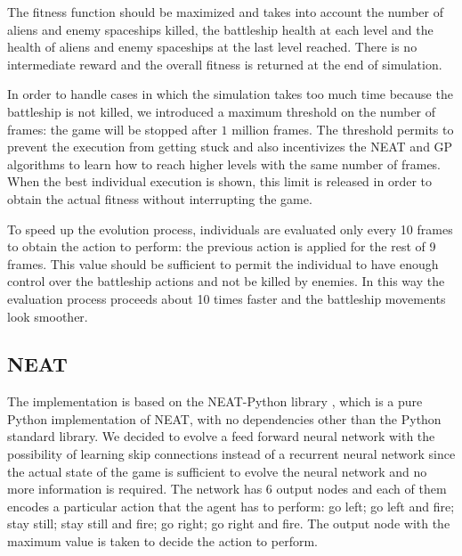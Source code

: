 The fitness function should be maximized and takes into account the number of aliens and
enemy spaceships killed, the battleship health at each level and the health of aliens and
enemy spaceships at the last level reached. There is no intermediate reward and the overall
fitness is returned at the end of simulation.

In order to handle cases in which the simulation takes too much time because the battleship
is not killed, we introduced a maximum threshold on the number of frames: the game will be
stopped after $1$ million frames. The threshold permits to prevent the execution from getting
stuck and also incentivizes the NEAT and GP algorithms to learn how to reach higher levels
with the same number of frames. When the best individual execution is shown,
this limit is released in order to obtain the actual fitness without interrupting the game.

To speed up the evolution process, individuals are evaluated only every 10 frames to obtain
the action to perform: the previous action is applied for the rest of 9 frames. This value
should be sufficient to permit the individual to have enough control over the battleship
actions and not be killed by enemies. In this way the evaluation process proceeds about 10
times faster and the battleship movements look smoother.


\subsection{NEAT}
The implementation is based on the NEAT-Python library \cite{NEAT-Python}, which is a pure Python
implementation of NEAT, with no dependencies other than the Python standard library.
We decided to evolve a feed forward neural network with the possibility of learning skip
connections instead of a recurrent neural network since the actual state of the game is
sufficient to evolve the neural network and no more information is required. The network has 6
output nodes and each of them encodes a particular action that the agent has to perform:
go left; go left and fire; stay still; stay still and fire; go right; go right and fire.
The output node with the maximum value is taken to decide the action to perform.

